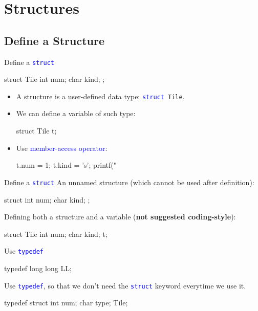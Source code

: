 \documentclass{beamer}
\newcommand{\blue}[1]{\textcolor{blue}{#1}}
\newcommand{\ttt}[1]{\texttt{#1}}
\newcommand{\bluett}[1]{\blue{\ttt{#1}}}
\theoremstyle{definition}
\begin{document}
\section{Structures}

\subsection{Define a Structure}

\begin{frame}[fragile]{Define a \bluett{struct}}
    \begin{cpp}
struct Tile {
  int num;
  char kind;
};
    \end{cpp}
    \pause
    \begin{itemize}
        \item A structure is a user-defined data type: \bluett{struct }\ttt{Tile}.
        \item We can define a variable of such type:
        \begin{cpp}
struct Tile t;
        \end{cpp}
        \pause
        \item Use \blue{member-access operator}:
        \begin{cpp}
t.num = 1;
t.kind = 's';
printf("%
        \end{cpp}
    \end{itemize}
\end{frame}

\begin{frame}[fragile]{Define a \bluett{struct}}
    An unnamed structure (which cannot be used after definition):
    \begin{cpp}
struct {
  int num;
  char kind;
};
    \end{cpp}
    \pause
    Defining both a structure and a variable (\textbf{not suggested coding-style}):
    \begin{cpp}
struct Tile {
  int num;
  char kind;
} t;
    \end{cpp}
\end{frame}

\begin{frame}[fragile]{Use \bluett{typedef}}
    \begin{cpp}
typedef long long LL;
    \end{cpp}
    Use \bluett{typedef}, so that we don't need the \bluett{struct} keyword everytime we use it.
    \begin{cpp}
typedef struct {
  int num;
  char type;
} Tile;
    \end{cpp}
\end{frame}
\end{document}
